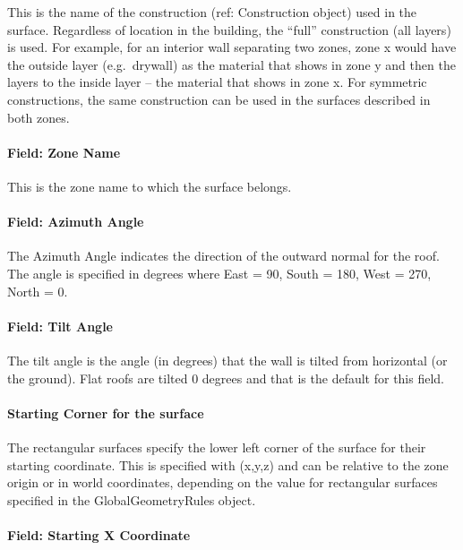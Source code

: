 This is the name of the construction (ref: Construction object) used in the surface. Regardless of location in the building, the ``full'' construction (all layers) is used. For example, for an interior wall separating two zones, zone x would have the outside layer (e.g.~drywall) as the material that shows in zone y and then the layers to the inside layer -- the material that shows in zone x. For symmetric constructions, the same construction can be used in the surfaces described in both zones.

\paragraph{Field: Zone Name}\label{field-zone-name-4-006}

This is the zone name to which the surface belongs.

\paragraph{Field: Azimuth Angle}\label{field-azimuth-angle-4}

The Azimuth Angle indicates the direction of the outward normal for the roof. The angle is specified in degrees where East = 90, South = 180, West = 270, North = 0.

\paragraph{Field: Tilt Angle}\label{field-tilt-angle-4}

The tilt angle is the angle (in degrees) that the wall is tilted from horizontal (or the ground). Flat roofs are tilted 0 degrees and that is the default for this field.

\paragraph{Starting Corner for the surface}\label{starting-corner-for-the-surface-4}

The rectangular surfaces specify the lower left corner of the surface for their starting coordinate. This is specified with (x,y,z) and can be relative to the zone origin or in world coordinates, depending on the value for rectangular surfaces specified in the GlobalGeometryRules object.

\paragraph{Field: Starting X Coordinate}\label{field-starting-x-coordinate-4}

